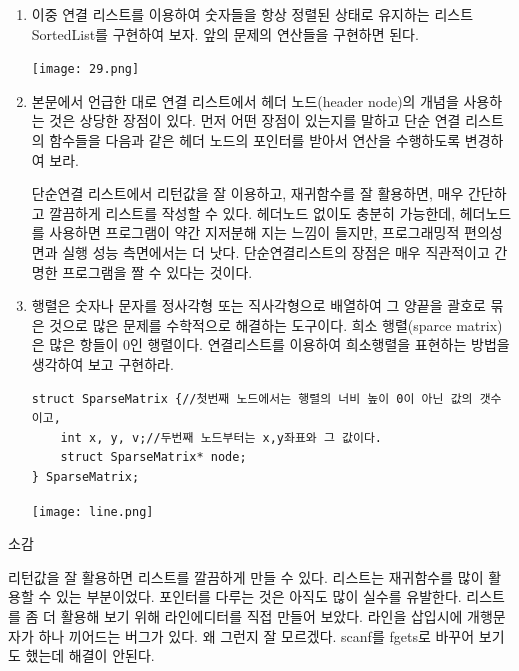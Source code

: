 \documentclass[11pt,a4paper]{article}
\begin{document}
\begin{enumerate}
\item 이중 연결 리스트를 이용하여 숫자들을 항상 정렬된 상태로 유지하는 리스트 SortedList를 구현하여 보자.
앞의 문제의 연산들을 구현하면 된다.

\texttt{[image: 29.png]}

\item 본문에서 언급한 대로 연결 리스트에서 헤더 노드(header node)의 개념을 사용하는 것은 상당한 장점이 있다. 먼저 어떤 장점이 있는지를 말하고 단순 연결 리스트의 함수들을 다음과 같은 헤더 노드의 포인터를 받아서 연산을 수행하도록 변경하여 보라.

단순연결 리스트에서 리턴값을 잘 이용하고, 재귀함수를 잘 활용하면, 매우 간단하고 깔끔하게 리스트를 작성할 수 있다. 헤더노드 없이도 충분히 가능한데, 헤더노드를 사용하면 프로그램이 약간 지저분해 지는 느낌이 들지만, 프로그래밍적 편의성 면과 실행 성능 측면에서는 더 낫다. 단순연결리스트의 장점은 매우 직관적이고 간명한 프로그램을 짤 수 있다는 것이다.
\item 행렬은 숫자나 문자를 정사각형 또는 직사각형으로 배열하여 그 양끝을 괄호로 묶은 것으로 많은 문제를 수학적으로 해결하는 도구이다. 희소 행렬(sparce matrix)은 많은 항들이 0인 행렬이다. 
연결리스트를 이용하여 희소행렬을 표현하는 방법을 생각하여 보고 구현하라.
\begin{lstlisting}
struct SparseMatrix {//첫번째 노드에서는 행렬의 너비 높이 0이 아닌 값의 갯수이고, 
	int x, y, v;//두번째 노드부터는 x,y좌표와 그 값이다.
	struct SparseMatrix* node;
} SparseMatrix;
\end{lstlisting}

\texttt{[image: line.png]}
\end{enumerate}

\vspace{2cm}
{\Huge 소감}

리턴값을 잘 활용하면 리스트를 깔끔하게 만들 수 있다. 리스트는 재귀함수를 많이 활용할 수 있는 부분이었다. 포인터를 다루는 것은 아직도 많이 실수를 유발한다. 리스트를 좀 더 활용해 보기 위해 라인에디터를 직접 만들어 보았다. 라인을 삽입시에 개행문자가 하나 끼어드는 버그가 있다. 왜 그런지 잘 모르겠다. scanf를 fgets로 바꾸어 보기도 했는데 해결이 안된다.
\end{document}
